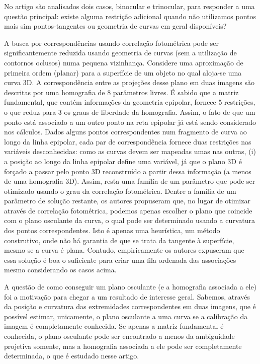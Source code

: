 No artigo são analisados dois casos, binocular e trinocular, para responder a uma questão principal: existe alguma restrição adicional quando não utilizamos pontos mais sim pontos-tangentes ou geometria de curvas em geral disponíveis?\\


A busca por correspondências usando correlação fotométrica pode ser significantemente reduzida usando geometria de curvas (sem a utilização de contornos oclusos) numa pequena vizinhança. Considere uma aproximação de primeira ordem (planar) para a superfície de um objeto no qual aloja-se uma curva 3D. A correspondência entre as projeções desse plano em duas imagens são descritas por uma homografia de 8 parâmetros livres. É sabido que a matriz fundamental, que contém informações da geometria epipolar, fornece 5 restrições, o que reduz para 3 os graus de liberdade da homografia. Assim, o fato de que um ponto está associado a um outro ponto na reta epipolar já está sendo considerado nos cálculos. Dados alguns pontos correspondentes num fragmento de curva ao longo da linha epipolar, cada par de correspondência fornece duas restrições nas variáveis desconhecidas: como as curvas devem ser mapeadas umas nas outras, (i) a posição ao longo da linha epipolar define uma variável, já que o plano 3D é forçado a passar pelo ponto 3D reconstruído a partir dessa informação (a menos de uma homografia 3D). Assim, resta uma família de um parâmetro que pode ser otimizado usando o grau da correlação fotométrica. Dentre a família de um parâmetro de solução restante, os autores propuseram que, no lugar de otimizar através de correlação fotométrica, podemos apenas escolher o plano que coincide com o plano osculante da curva, o qual pode ser determinado usando a curvatura dos pontos correspondentes. Isto é apenas uma heurística, um método construtivo, onde não há garantia de que se trata da tangente à superfície, mesmo se a curva é plana. Contudo, empiricamente os autores expuseram que essa solução é boa o suficiente para criar uma fila ordenada das associações mesmo considerando os casos acima.

A questão de como conseguir um plano osculante (e a homografia associada a ele) foi a motivação para chegar a um resultado de interesse geral. Sabemos, através da posição e curvatura das extremidades correspondentes em duas imagens, que é possível estimar, unicamente, o plano osculante a uma curva se a calibração da imagem é completamente conhecida. Se apenas a matriz fundamental é conhecida, o plano osculante pode ser encontrado a menos da ambiguidade projetiva somente, mas a homografia associada a ele pode ser completamente determinada, o que é estudado nesse artigo.

